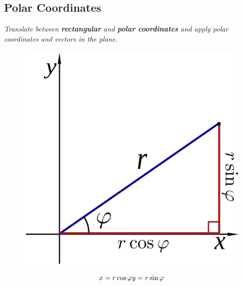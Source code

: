\subsection{Polar Coordinates}

\textit{Translate between \textbf{rectangular} and \textbf{polar coordinates} and apply polar coordinates and vectors in the plane.}

\vspace{1cm}


\begin{figure}[h]
    \begin{center}
        \includegraphics[scale=.25]{./public/images/polarCartesian}
    \end{center}
\end{figure}

\begin{equation*}
    x = r \cos \varphi\\
    y = r \sin \varphi
\end{equation*}